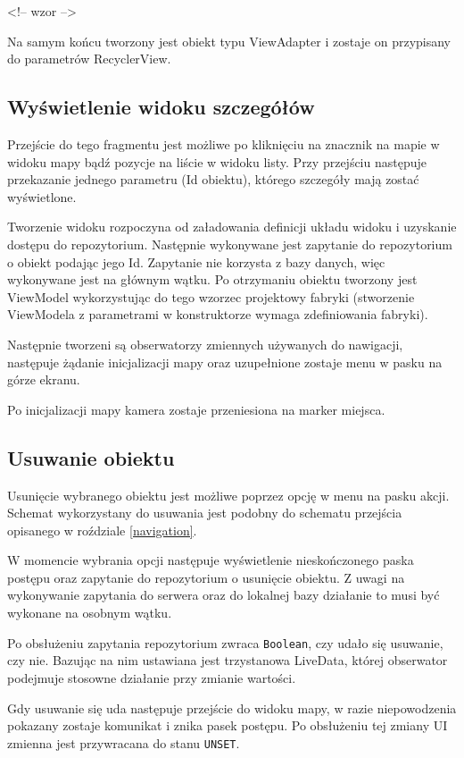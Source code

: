 \documentclass[polish,polish,a4paper,12pt]{article}
\begin{document}
	<!-- wzor -->

	Na samym końcu tworzony jest obiekt typu ViewAdapter i zostaje on przypisany do parametrów RecyclerView.

	\subsection{Wyświetlenie widoku szczegółów}

	Przejście do tego fragmentu jest możliwe po kliknięciu na znacznik na mapie w widoku mapy bądź pozycje na liście w widoku listy. Przy przejściu następuje przekazanie jednego parametru (Id obiektu), którego szczegóły mają zostać wyświetlone.

	Tworzenie widoku rozpoczyna od załadowania definicji układu widoku i uzyskanie dostępu do repozytorium. Następnie wykonywane jest zapytanie do repozytorium o obiekt podając jego Id. Zapytanie nie korzysta z bazy danych, więc wykonywane jest na głównym wątku. Po otrzymaniu obiektu tworzony jest ViewModel wykorzystując do tego wzorzec projektowy fabryki (stworzenie ViewModela z parametrami w konstruktorze wymaga zdefiniowania fabryki).

	Następnie tworzeni są obserwatorzy zmiennych używanych do nawigacji, następuje żądanie inicjalizacji mapy oraz uzupełnione zostaje menu w pasku na górze ekranu.

	Po inicjalizacji mapy kamera zostaje przeniesiona na marker miejsca.

	\subsection{Usuwanie obiektu}

	Usunięcie wybranego obiektu jest możliwe poprzez opcję w menu na pasku akcji. Schemat wykorzystany do usuwania jest podobny do schematu przejścia opisanego w roździale \ref{navigation}.

	W momencie wybrania opcji następuje wyświetlenie nieskończonego paska postępu oraz zapytanie do repozytorium o usunięcie obiektu. Z uwagi na wykonywanie zapytania do serwera oraz do lokalnej bazy działanie to musi być wykonane na osobnym wątku.

	Po obsłużeniu zapytania repozytorium zwraca \texttt{Boolean}, czy udało się usuwanie, czy nie. Bazując na nim ustawiana jest trzystanowa LiveData, której obserwator podejmuje stosowne działanie przy zmianie wartości.

	Gdy usuwanie się uda następuje przejście do widoku mapy, w razie niepowodzenia pokazany zostaje komunikat i znika pasek postępu. Po obsłużeniu tej zmiany UI zmienna jest przywracana do stanu \texttt{UNSET}.
\end{document}
